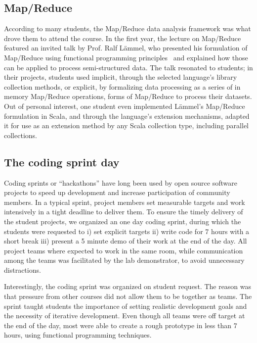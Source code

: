 \documentclass[conference]{sig-alternate}
\begin{document}
\subsection{Map/Reduce}

According to many students, the Map/Reduce data analysis framework was what
drove them to attend the course. In the first year, the lecture on Map/Reduce featured an invited
talk by Prof. Ralf L\"ammel, who presented his formulation of Map/Reduce using
functional programming principles~\cite{Lamme08} and explained how those can be
applied to process semi-structured data. The talk resonated to students; in
their projects, students used implicit, through the selected language's library
collection methods, or explicit, by formalizing data processing as a series of
in memory Map/Reduce operations, forms of Map/Reduce to process their datasets.
Out of personal interest, one student even implemented L\"ammel's Map/Reduce
formulation in Scala, and through the language's extension mechanisms, adapted
it for use as an extension method by any Scala collection type, including
parallel collections. 

\subsection{The coding sprint day}

Coding sprints or ``hackathons'' have long been used by open source software
projects to speed up development and increase participation of community
members. In a typical sprint, project members set measurable
targets and work intensively in a tight deadline to deliver them. To ensure the
timely delivery of the student projects, we organized an one day coding sprint,
during which the students were requested to i) set explicit targets ii) write
code for 7 hours with a short break iii) present a 5 minute demo of their work
at the end of the day. All project teams where expected to work in the same
room, while communication among the teams was facilitated by the lab
demonstrator, to avoid unnecessary distractions.

Interestingly, the coding sprint was organized on student request. The reason
was that pressure from other courses did not allow them to be together as teams.
The sprint taught students the importance of setting realistic development goals
and the necessity of iterative development. Even though all teams were off
target at the end of the day, most were able to create a rough prototype in less
than 7 hours, using functional programming techniques. 
\end{document}
